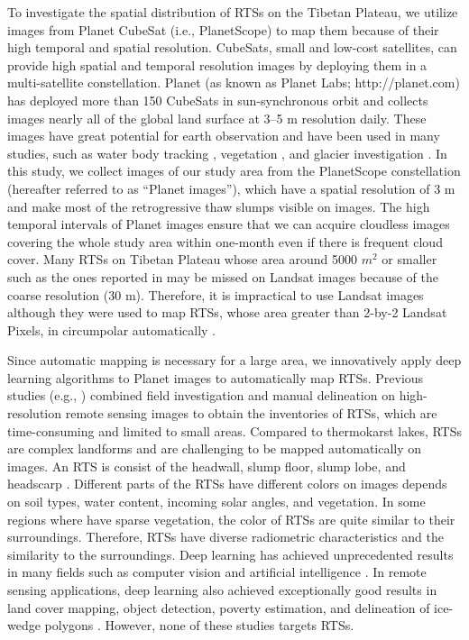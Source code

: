 \documentclass[preprint,12pt,authoryear]{elsarticle}
\begin{document}
To investigate the spatial distribution of RTSs on the Tibetan Plateau, we utilize images from Planet CubeSat (i.e., PlanetScope) to map them because of their high temporal and spatial resolution. CubeSats, small and low-cost satellites, can provide high spatial and temporal resolution images by deploying them in a multi-satellite constellation. Planet (as known as Planet Labs; http://planet.com) has deployed more than 150 CubeSats in sun-synchronous orbit and collects images nearly all of the global land surface at 3--5 m resolution daily. These images have great potential for earth observation and have been used in many studies, such as water body tracking \citep{cooley2017tracking, cooley2019arctic, aragon2018cubesats, miles2018glacial}, vegetation \citep{houborg2016high, houborg2018daily}, and glacier investigation \citep{altena2017glacier}. In this study, we collect images of our study area from the PlanetScope constellation (hereafter referred to as “Planet images”), which have a spatial resolution of 3 m and make most of the retrogressive thaw slumps visible on images. The high temporal intervals of Planet images ensure that we can acquire cloudless images covering the whole study area within one-month even if there is frequent cloud cover. Many RTSs on Tibetan Plateau whose area around 5000 $m^2$ or smaller such as the ones reported in \citep{niu2012development,niu2016thaw} may be missed on Landsat images because of the coarse resolution (30 m). Therefore, it is impractical to use Landsat images although they were used to map RTSs, whose area greater than 2-by-2 Landsat Pixels, in circumpolar automatically \citep{lacelle_distribution_2015, brooker2014mapping, nitze2018remote}. 

Since automatic mapping is necessary for a large area, we innovatively apply deep learning algorithms to Planet images to automatically map RTSs. Previous studies (e.g., \citealp{ramage_terrain_2017, lantuit_fifty_2008, niu2014thaw}) combined field investigation and manual delineation on high-resolution remote sensing images to obtain the inventories of RTSs, which are time-consuming and limited to small areas. Compared to thermokarst lakes, RTSs are complex landforms and are challenging to be mapped automatically on images. An RTS is consist of the headwall, slump floor, slump lobe, and headscarp \citep{lantuit_fifty_2008}. Different parts of the RTSs have different colors on images depends on soil types, water content, incoming solar angles, and vegetation. In some regions where have sparse vegetation, the color of RTSs are quite similar to their surroundings. Therefore, RTSs have diverse radiometric characteristics and the similarity to the surroundings. Deep learning has achieved unprecedented results in many fields such as computer vision and artificial intelligence \citep{krizhevsky_imagenet_2012, lecun_deep_2015, silver_mastering_2017}. In remote sensing applications, deep learning also achieved exceptionally good results in land cover mapping, object detection, poverty estimation, and delineation of ice-wedge polygons \citep{jean_combining_2016, guo_geospatial_2018, zhang2018deep}. However, none of these studies targets RTSs. 
\end{document}
